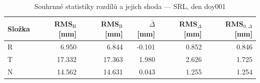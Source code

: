 \begin{table}[H]
\centering
\caption{Souhrnné statistiky rozdílů a jejich shoda — SRL, den doy001}
\label{tab:hermite_vs_bernese_srl_doy001_summary}
\begin{tabular}{lrrrrr}
\toprule
Složka & RMS$_\mathrm{H}$ [mm] & RMS$_\mathrm{B}$ [mm] & $\bar{\Delta}$ [mm] & RMS$_{\Delta}$ [mm] & RMS$_{0,\Delta}$ [mm] \\
\midrule
R & 6.950 & 6.844 & -0.101 & 0.852 & 0.846 \\
T & 17.332 & 17.363 & 1.980 & 2.626 & 1.725 \\
N & 14.562 & 14.631 & 0.043 & 1.255 & 1.254 \\
\bottomrule
\end{tabular}
\end{table}
